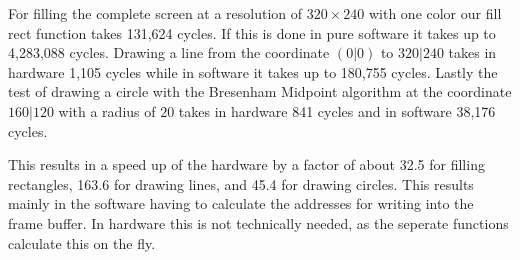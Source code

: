 For filling the complete screen at a resolution of \(320 \times 240\) with one color our fill rect function takes 131,624 cycles. If this is done in pure software it takes up to 4,283,088 cycles.
Drawing a line from the coordinate \((0|0)\) to \(320|240\) takes in hardware 1,105 cycles while in software it takes up to 180,755 cycles. Lastly the test of drawing a circle with the Bresenham Midpoint algorithm at the coordinate \(160|120\) with a radius of \(20\) takes in hardware 841 cycles and in software 38,176 cycles.

This results in a speed up of the hardware by a factor of about 32.5 for filling rectangles, 163.6 for drawing lines, and 45.4 for drawing circles. This results mainly in the software having to calculate the addresses for writing into the frame buffer. In hardware this is not technically needed, as the seperate functions calculate this on the fly.